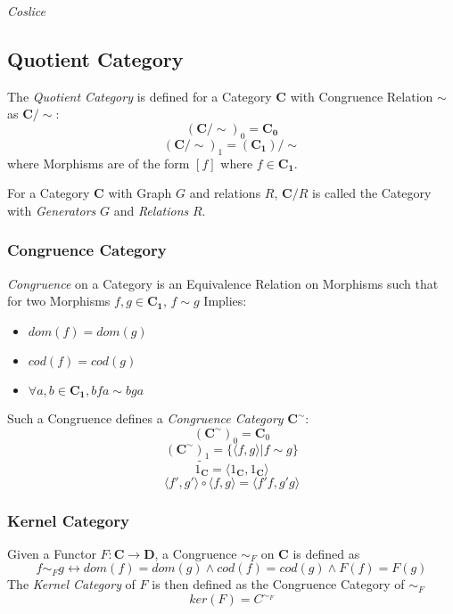 \emph{Coslice}



\subsection{Quotient Category}\label{sec:quotient_category}


The \emph{Quotient Category} is defined for a Category $\mathbf{C}$
with Congruence Relation $\sim$ as $\mathbf{C}/\sim$:
\[
    (\mathbf{C}/\sim)_0 = \mathbf{C_0}
\]\[
    (\mathbf{C}/\sim)_1 = (\mathbf{C_1})/\sim
\]
where Morphisms are of the form $[f]$ where $f \in \mathbf{C_1}$.

For a Category $\mathbf{C}$ with Graph $G$ and relations $R$,
$\mathbf{C}/R$ is called the Category with \emph{Generators} $G$ and
\emph{Relations} $R$.



\subsubsection{Congruence Category}\label{sec:congruence_category}

\emph{Congruence} on a Category is an Equivalence Relation on
Morphisms such that for two Morphisms $f,g \in \mathbf{C_1}$, $f \sim
g$ Implies:
\begin{itemize}
\item $dom(f) = dom(g)$
\item $cod(f) = cod(g)$
\item $\forall a,b \in \mathbf{C_1}, bfa \sim bga$
\end{itemize}
Such a Congruence defines a \emph{Congruence Category}
$\mathbf{C^{\sim}}$:
\[
    (\mathbf{C^{\sim}})_0 = \mathbf{C}_0
\]\[
    (\mathbf{C^{\sim}})_1 = \{\langle f,g \rangle | f \sim g\}
\]\[
    \tilde{1_\mathbf{C}} = \langle 1_\mathbf{C}, 1_\mathbf{C} \rangle
\]\[
    \langle f',g' \rangle \circ \langle f,g \rangle = \langle f'f,g'g \rangle
\]



\subsubsection{Kernel Category}\label{sec:kernel_category}

Given a Functor $F : \mathbf{C} \rightarrow \mathbf{D}$, a Congruence
$\sim_F$ on $\mathbf{C}$ is defined as
\[
    f \sim_F g \leftrightarrow dom(f) = dom(g) \wedge cod(f) = cod(g)
    \wedge F(f) = F(g)
\]
The \emph{Kernel Category} of $F$ is then defined as the Congruence
Category of $\sim_F$
\[
    ker(F) = C^{\sim_F}
\]



